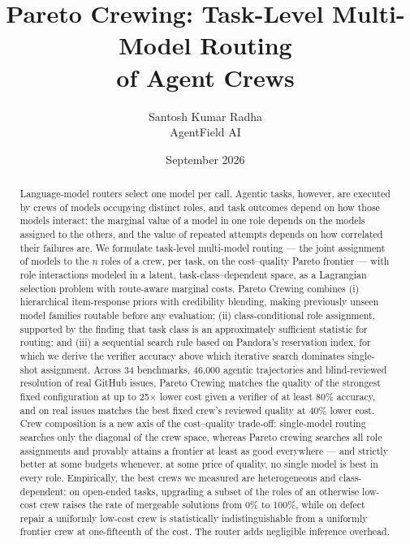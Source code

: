 \documentclass[11pt,a4paper]{article}
\title{\textbf{Pareto Crewing: Task-Level Multi-Model Routing\\ of Agent Crews}}
\author{Santosh Kumar Radha\\[2pt]\small AgentField AI}
\date{September 2026}
\theoremstyle{definition}
\theoremstyle{remark}
\theoremstyle{definition}
\begin{document}
\maketitle
\thispagestyle{fancy}

\begin{abstract}
\noindent
Language-model routers select one model per call. Agentic tasks, however, are executed by crews of models occupying distinct roles, and task outcomes depend on how those models interact: the marginal value of a model in one role depends on the models assigned to the others, and the value of repeated attempts depends on how correlated their failures are. We formulate task-level multi-model routing --- the joint assignment of models to the $n$ roles of a crew, per task, on the cost--quality Pareto frontier --- with role interactions modeled in a latent, task-class--dependent space, as a Lagrangian selection problem with route-aware marginal costs. Pareto Crewing combines (i) hierarchical item-response priors with credibility blending, making previously unseen model families routable before any evaluation; (ii) class-conditional role assignment, supported by the finding that task class is an approximately sufficient statistic for routing; and (iii) a sequential search rule based on Pandora's reservation index, for which we derive the verifier accuracy above which iterative search dominates single-shot assignment. Across 34 benchmarks, 46{,}000 agentic trajectories and blind-reviewed resolution of real GitHub issues, Pareto Crewing matches the quality of the strongest fixed configuration at up to 25$\times$ lower cost given a verifier of at least 80\% accuracy, and on real issues matches the best fixed crew's reviewed quality at 40\% lower cost. Crew composition is a new axis of the cost--quality trade-off: single-model routing searches only the diagonal of the crew space, whereas Pareto crewing searches all role assignments and provably attains a frontier at least as good everywhere --- and strictly better at some budgets whenever, at some price of quality, no single model is best in every role. Empirically, the best crews we measured are heterogeneous and class-dependent: on open-ended tasks, upgrading a subset of the roles of an otherwise low-cost crew raises the rate of mergeable solutions from 0\% to 100\%, while on defect repair a uniformly low-cost crew is statistically indistinguishable from a uniformly frontier crew at one-fifteenth of the cost. The router adds negligible inference overhead.
\end{abstract}
\end{document}
